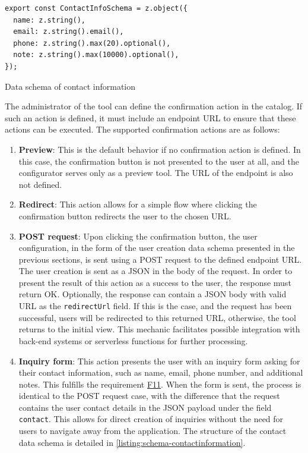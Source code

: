 \begin{listing}[h!]
\begin{verbatim}
export const ContactInfoSchema = z.object({
  name: z.string(),
  email: z.string().email(),
  phone: z.string().max(20).optional(),
  note: z.string().max(10000).optional(),
});
\end{verbatim}
\caption{Data schema of contact information}
\label{listing:schema-contactinformation}
\end{listing}

The administrator of the tool can define the confirmation action in the catalog. If such an action is defined, it must include an endpoint URL to ensure that these actions can be executed. The supported confirmation actions are as follows:

\begin{enumerate}
    \item \textbf{Preview}: This is the default behavior if no confirmation action is defined. In this case, the confirmation button is not presented to the user at all, and the configurator serves only as a preview tool. The URL of the endpoint is also not defined.
    \item \textbf{Redirect}: This action allows for a simple flow where clicking the confirmation button redirects the user to the chosen URL.
    \item \textbf{POST request}: Upon clicking the confirmation button, the user configuration, in the form of the user creation data schema presented in the previous sections, is sent using a POST request to the defined endpoint URL. The user creation is sent as a JSON in the body of the request. In order to present the result of this action as a success to the user, the response must return OK. Optionally, the response can contain a JSON body with valid URL as the \texttt{redirectUrl} field. If this is the case, and the request has been successful, users will be redirected to this returned URL, otherwise, the tool returns to the initial view. This mechanic facilitates possible integration with back-end systems or serverless functions for further processing.
    \item \textbf{Inquiry form}: This action presents the user with an inquiry form asking for their contact information, such as name, email, phone number, and additional notes. This fulfills the requirement \hyperref[itm:F11]{F11}. When the form is sent, the process is identical to the POST request case, with the difference that the request contains the user contact details in the JSON payload under the field \texttt{contact}. This allows for direct creation of inquiries without the need for users to navigate away from the application. The structure of the contact data schema is detailed in \autoref{listing:schema-contactinformation}.
\end{enumerate}


